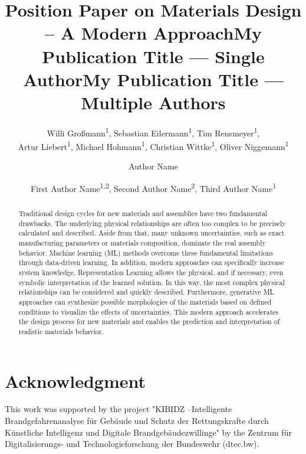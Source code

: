 \documentclass[letterpaper]{article} %
\title{Position Paper on Materials Design -- A Modern Approach}
\author{
    Willi Gro{\ss}mann\textsuperscript{\rm 1}, %
    Sebastian Eilermann\textsuperscript{\rm 1}, %
    Tim Rensmeyer\textsuperscript{\rm 1}, \\
    Artur Liebert\textsuperscript{\rm 1},  Michael Hohmann\textsuperscript{\rm 1}, Christian Wittke\textsuperscript{\rm 1},
    Oliver Niggemann\textsuperscript{\rm 1}
}
\title{My Publication Title --- Single Author}
\author {
    Author Name
}
\title{My Publication Title --- Multiple Authors}
\author {
    First Author Name\textsuperscript{\rm 1,\rm 2},
    Second Author Name\textsuperscript{\rm 2},
    Third Author Name\textsuperscript{\rm 1}
}
\begin{document}
\maketitle
\thispagestyle{fancy}

\begin{abstract}
Traditional design cycles for new materials and assemblies have two fundamental drawbacks. The underlying physical relationships are often too complex to be precisely calculated and described. Aside from that, many unknown uncertainties, such as exact manufacturing parameters or materials composition, dominate the real assembly behavior. Machine learning (ML) methods overcome these fundamental limitations through data-driven learning. In addition, modern approaches can specifically increase system knowledge. Representation Learning allows the physical, and if necessary, even symbolic interpretation of the learned solution. In this way, the most complex physical relationships can be considered and quickly described. Furthermore, generative ML approaches can synthesize possible morphologies of the materials based on defined conditions to visualize the effects of uncertainties. This modern approach accelerates the design process for new materials and enables the prediction and interpretation of realistic materials behavior.

\end{abstract}









\section{Acknowledgment}
\label{Ackn}
This work was supported by the project "KIBIDZ --Intelligente Brandgefahrenanalyse f\"ur Geb\"aude und Schutz der Rettungskrafte durch K\"unstliche Intelligenz und Digitale Brandgeb\"audezwillinge" by the Zentrum f\"ur Digitalisierungs- und Technologieforschung der Bundeswehr (dtec.bw).
\end{document}
